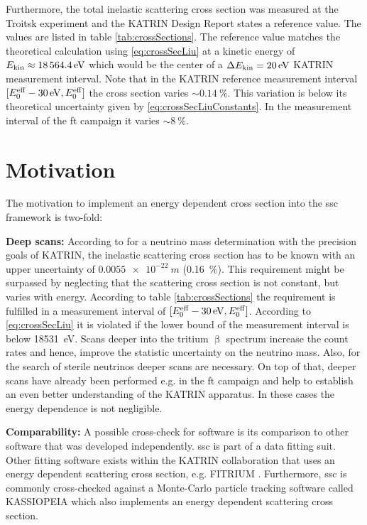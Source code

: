 Furthermore, the total inelastic scattering cross section was measured at the Troitsk experiment and the KATRIN Design Report states a reference value. The values are listed in table \ref{tab:crossSections}. The reference value matches the theoretical calculation using \eqref{eq:crossSecLiu} at a kinetic energy of $E_\mathrm{kin}\approx\SI{18564.4}{eV}$ which would be the center of a $\Delta E_\mathrm{kin}=\SI{20}{eV}$ KATRIN measurement interval. Note that in the KATRIN reference measurement interval $[E_0^\mathrm{eff}-\SI{30}{eV}, E_0^\mathrm{eff}]$ the cross section varies  $\sim\SI{0.14}{\percent}$. This variation is below its theoretical uncertainty given by \eqref{eq:crossSecLiuConstants}. In the measurement interval of the \gls{ft} campaign it varies $\sim\SI{8}{\percent}$.
    
\section{Motivation}
The motivation to implement an energy dependent cross section into the \gls{ssc} framework is two-fold:
\par{\textbf{Deep scans:} According to \cite{Groh2015} for a neutrino mass determination with the precision goals of KATRIN, the inelastic scattering cross section has to be known with an upper uncertainty of $\SI{0.0055e-22}{m}$ (\SI{0.16}{\percent}). This requirement might be surpassed by neglecting that the scattering cross section is not constant, but varies with energy. According to table \ref{tab:crossSections} the requirement is fulfilled in a measurement interval of $[E_0^\mathrm{eff}-\SI{30}{eV}, E_0^\mathrm{eff}]$. According to \eqref{eq:crossSecLiu} it is violated if the lower bound of the measurement interval is below \SI{18531}{eV}. Scans deeper into the tritium $\upbeta$ spectrum increase the count rates and hence, improve the statistic uncertainty on the neutrino mass. Also, for the search of sterile neutrinos deeper scans are necessary. On top of that, deeper scans have already been performed e.g. in the \gls{ft} campaign and help to establish an even better understanding of the KATRIN apparatus. In these cases the energy dependence is not negligible.}
\par{\textbf{Comparability:} A possible cross-check for software is its comparison to other software that was developed independently. \gls{ssc} is part of a data fitting suit. Other fitting software exists within the KATRIN collaboration that uses an energy dependent scattering cross section, e.g. FITRIUM \cite{Fitrium}. Furthermore, \gls{ssc} is commonly cross-checked against a Monte-Carlo particle tracking software called KASSIOPEIA \cite{KATRINCOL2019} which also implements an energy dependent scattering cross section.}
    
